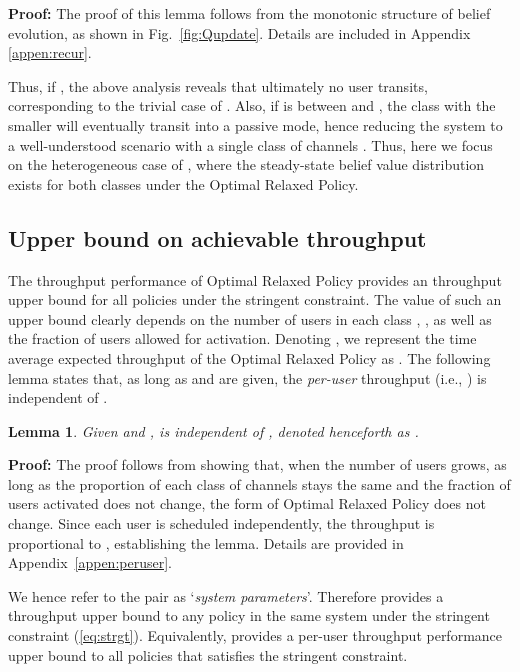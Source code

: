 \documentclass[11pt,twocolumn]{IEEEtran}
\newtheorem{lemma}{Lemma}
\begin{document}
\noindent \textbf{Proof:} The proof of this lemma follows from the
monotonic structure of belief evolution, as shown in
Fig.~\ref{fig:Qupdate}. Details are included in Appendix
\ref{appen:recur}.  \vspace{3pt}

Thus, if , the above analysis reveals that ultimately no user
transits, corresponding to the trivial case of . Also, if  is between
 and , the class with the smaller
 will eventually transit into a passive mode, hence
reducing the system to a well-understood scenario with a single class of channels \cite{Liu}\cite{Javidi}. Thus, here we focus on the
heterogeneous case of , where the steady-state belief value distribution
exists for both classes under the Optimal Relaxed Policy.

\subsection{Upper bound on achievable throughput}
The throughput performance of Optimal Relaxed Policy provides an throughput
upper bound for all policies under the stringent constraint. The
value of such an upper bound clearly depends on the number of users
in each class , , as well as the fraction
 of users allowed for activation. Denoting , we represent the time average expected throughput of the Optimal Relaxed Policy as
. The following lemma states
that, as long as  and  are given, the \emph{per-user} throughput (i.e., ) is independent of .

\begin{lemma}
\label{lemma:parameter}
Given  and ,  is independent of , denoted henceforth as .
\end{lemma}

\noindent \textbf{Proof:} The proof follows from showing that, when the number of users  grows, as long as the proportion of each class of channels stays the same and the fraction  of users activated does not change, the form of Optimal Relaxed Policy does not change. Since each user is scheduled independently, the throughput  is proportional to , establishing the lemma. Details are provided in Appendix~\ref{appen:peruser}. 

\vspace{3pt}

We hence refer to the  pair as `\emph{system parameters}'. Therefore  provides a throughput upper bound to any policy in the same system under the stringent constraint (\ref{eq:strgt}). Equivalently,  provides a per-user throughput performance upper bound to all policies that satisfies the stringent constraint.
\end{document}

